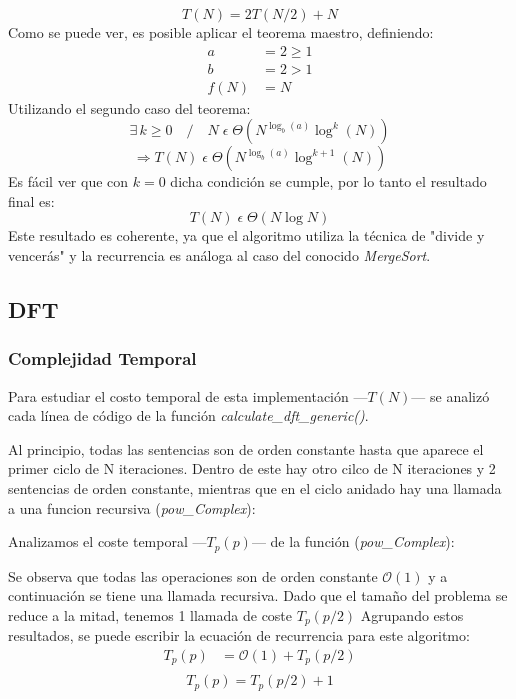 \documentclass{article}
\begin{document}
    \begin{equation*}
      \boxed{T(N) = 2T(N/2) + N}
    \end{equation*}
      Como se puede ver, es posible aplicar el teorema maestro, definiendo:
    \begin{align*}
      a &= 2 \geq 1 \\
      b &= 2 > 1\\
   f(N) &= N
    \end{align*}
      Utilizando el segundo caso del teorema:
    $$ \exists\,k \geq 0 \quad / \quad N \;\epsilon\; \Theta (N^{\log_b (a)} \log^k (N)) $$
    $$ \Rightarrow T(N)\;\epsilon\;\Theta (N^{\log_b (a)} \log^{k+1} (N)) $$
      Es fácil ver que con $k=0$ dicha condición se cumple, por lo tanto
    el resultado final es:
    $$ \boxed{T(N)\;\epsilon\;\Theta (N \log N)} $$
      Este resultado es coherente, ya que el algoritmo utiliza la técnica de 
    "divide y vencerás" y la recurrencia es análoga al caso del conocido 
    \textit{MergeSort}.
    
    \subsection{DFT}
    \subsubsection{Complejidad Temporal}
      Para estudiar el costo temporal de esta implementación ---$T(N)$--- se analizó
    cada línea de código de la función \textit{calculate\_dft\_generic()}.\par
    Al principio, todas las sentencias son de orden constante hasta que
    aparece el primer ciclo de N iteraciones. Dentro de este hay otro cilco de N 
  iteraciones y 2 sentencias de orden constante, mientras que en el ciclo anidado 
  hay una llamada a una funcion recursiva (\textit{pow\_Complex}):
  
  Analizamos el coste temporal ---$T_p(p)$--- de la función (\textit{pow\_Complex}):
  
    Se observa que todas las operaciones son de orden constante $\mathcal{O}(1)$ 
    y a continuación se tiene una llamada recursiva. Dado que el tamaño del problema se reduce 
    a la mitad, tenemos 1 llamada de coste $T_p(p/2)$
    Agrupando estos resultados, se puede escribir la
      ecuación de recurrencia para este algoritmo:
    \begin{align*}
      T_p(p) &= \mathcal{O}(1) + T_p(p/2)\\
  \end{align*}
      \begin{equation*}
        \boxed{T_p(p) = T_p(p/2) + 1}
      \end{equation*}
    
\end{document}
